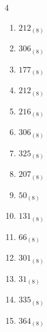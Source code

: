 \begin{multicols}{4}
\begin{enumerate}
        \phantom{$=127$}

  \item $212_{(8)}$

        \phantom{$=138$}

  \item $306_{(8)}$

        \phantom{$=198$}

  \item $177_{(8)}$

        \phantom{$=127$}

  \item $212_{(8)}$

        \phantom{$=138$}

  \item $216_{(8)}$

        \phantom{$=142$}

  \item $306_{(8)}$

        \phantom{$=198$}

  \item $325_{(8)}$

        \phantom{$=213$}

\columnbreak %

  \item $207_{(8)}$

        \phantom{$=135$}

  \item $50_{(8)}$

        \phantom{$=40$}

  \item $131_{(8)}$

        \phantom{$=89$}

  \item $66_{(8)}$

        \phantom{$=54$}

  \item $301_{(8)}$

        \phantom{$=193$}

  \item $31_{(8)}$

        \phantom{$=25$}

  \item $335_{(8)}$

        \phantom{$=221$}

  \item $364_{(8)}$

        \phantom{$=244$}


\end{enumerate}
\end{multicols}
